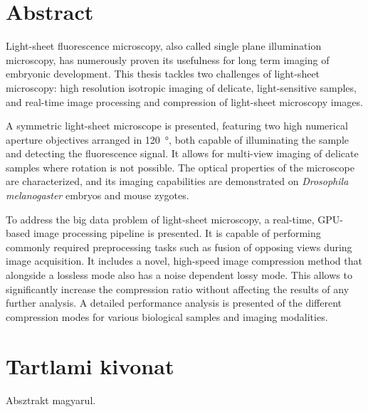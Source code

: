 
\chapter*{Abstract}
Light-sheet fluorescence microscopy, also called single plane illumination microscopy, has numerously proven its usefulness for long term imaging of embryonic development. This thesis tackles two challenges of light-sheet microscopy: high resolution isotropic imaging of delicate, light-sensitive samples, and real-time image processing and compression of light-sheet microscopy images.

A symmetric light-sheet microscope is presented, featuring two high numerical aperture objectives arranged in \SI{120}{\degree}, both capable of illuminating the sample and detecting the fluorescence signal. It allows for multi-view imaging of delicate samples where rotation is not possible. The optical properties of the microscope are characterized, and its imaging capabilities are demonstrated on \textit{Drosophila melanogaster} embryos and mouse zygotes.

To address the big data problem of light-sheet microscopy, a real-time, GPU-based image processing pipeline is presented. It is capable of performing commonly required preprocessing tasks such as fusion of opposing views during image acquisition. It includes a novel, high-speed image compression method that alongside a lossless mode also has a noise dependent lossy mode. This allows to significantly increase the compression ratio without affecting the results of any further analysis. A detailed performance analysis is presented of the different compression modes for various biological samples and imaging modalities.








\chapter*{Tartlami kivonat}
Absztrakt magyarul.
